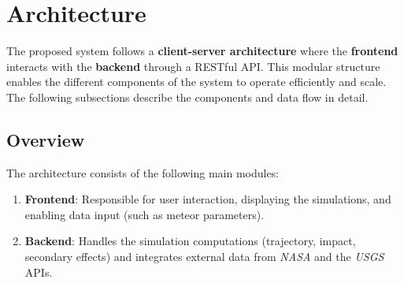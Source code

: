 \documentclass[conference]{IEEEtran}
\begin{document}
\section{Architecture}
The proposed system follows a \textbf{client-server architecture} where the
\textbf{frontend} interacts with the \textbf{backend} through a RESTful API. This
modular structure enables the different components of the system to operate
efficiently and scale. The following subsections describe the components and
data flow in detail.
\subsection{Overview}
The architecture consists of the following main modules:
\begin{enumerate}
	\item \textbf{Frontend}: Responsible for user interaction, displaying the
	      simulations, and enabling data input (such as meteor parameters).
	\item \textbf{Backend}: Handles the simulation computations (trajectory,
	      impact, secondary effects) and integrates external data from
	      \textit{NASA} and the \textit{USGS} APIs.
\end{enumerate}
\end{document}
